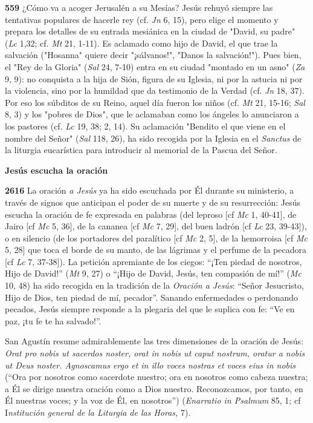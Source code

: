 \documentclass[]{article}
\begin{document}
\textbf{559} ¿Cómo va a acoger Jerusalén a su Mesías? Jesús rehuyó
siempre las tentativas populares de hacerle rey (cf. \emph{Jn} 6, 15),
pero elige el momento y prepara los detalles de su entrada mesiánica en
la ciudad de "David, su padre" (\emph{Lc} 1,32; cf. \emph{Mt} 21, 1-11).
Es aclamado como hijo de David, el que trae la salvación ("Hosanna"
quiere decir "¡sálvanos!", "Danos la salvación!"). Pues bien, el "Rey de
la Gloria" (\emph{Sal} 24, 7-10) entra en su ciudad "montado en un asno"
(\emph{Za} 9, 9): no conquista a la hija de Sión, figura de su Iglesia,
ni por la astucia ni por la violencia, sino por la humildad que da
testimonio de la Verdad (cf. \emph{Jn} 18, 37). Por eso los súbditos de
su Reino, aquel día fueron los niños (cf. \emph{Mt} 21, 15-16;
\emph{Sal} 8, 3) y los "pobres de Dios", que le aclamaban como los
ángeles lo anunciaron a los pastores (cf. \emph{Lc} 19, 38; 2, 14). Su
aclamación "Bendito el que viene en el nombre del Señor" (\emph{Sal}
118, 26), ha sido recogida por la Iglesia en el \emph{Sanctus} de la
liturgia eucarística para introducir al memorial de la Pascua del Señor.

\textbf{Jesús escucha la oración}

\textbf{2616} La oración \emph{a Jesús} ya ha sido escuchada por Él
durante su ministerio, a través de signos que anticipan el poder de su
muerte y de su resurrección: Jesús escucha la oración de fe expresada en
palabras (del leproso {[}cf \emph{Mc} 1, 40-41{]}, de Jairo {[}cf
\emph{Mc} 5, 36{]}, de la cananea {[}cf \emph{Mc} 7, 29{]}, del buen
ladrón {[}cf \emph{Lc} 23, 39-43{]}), o en silencio (de los portadores
del paralítico {[}cf \emph{Mc} 2, 5{]}, de la hemorroisa {[}cf \emph{Mc}
5, 28{]} que toca el borde de su manto, de las lágrimas y el perfume de
la pecadora {[}cf \emph{Lc} 7, 37-38{]}). La petición apremiante de los
ciegos: ``¡Ten piedad de nosotros, Hijo de David!'' (\emph{Mt} 9, 27) o
``¡Hijo de David, Jesús, ten compasión de mí!'' (\emph{Mc} 10, 48) ha
sido recogida en la tradición de la \emph{Oración a Jesús}: ``Señor
Jesucristo, Hijo de Dios, ten piedad de mí, pecador''. Sanando
enfermedades o perdonando pecados, Jesús siempre responde a la plegaria
del que le suplica con fe: ``Ve en paz, ¡tu fe te ha salvado!''.

San Agustín resume admirablemente las tres dimensiones de la oración de
Jesús: \emph{Orat pro nobis ut sacerdos noster, orat in nobis ut caput
nostrum, oratur a nobis ut Deus noster. Agnoscamus ergo et in illo voces
nostras et voces eius in nobis} (``Ora por nosotros como sacerdote
nuestro; ora en nosotros como cabeza nuestra; a Él se dirige nuestra
oración como a Dios nuestro. Reconozcamos, por tanto, en Él nuestras
voces; y la voz de Él, en nosotros'') (\emph{Enarratio in Psalmum} 85,
1; cf I\emph{nstitución general de la Liturgia de las Horas,} 7).
\end{document}
